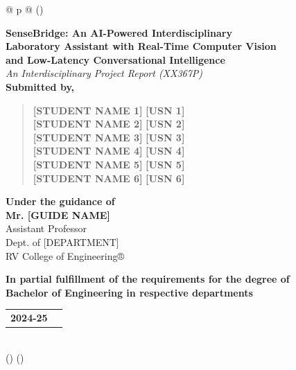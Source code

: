 \documentclass[]{article}
\begin{document}
\begin{longtable}[]{@{} p{\textwidth} @{}}
\toprule()
\begin{minipage}[b]{\linewidth}\raggedright
\centering
\vspace{1cm}
\textbf{SenseBridge: An AI-Powered Interdisciplinary} \\
\textbf{Laboratory Assistant with Real-Time Computer Vision} \\
\textbf{and Low-Latency Conversational Intelligence} \\
\vspace{0.5cm}
\emph{An Interdisciplinary Project Report (XX367P)} \\

\vspace{1.5cm}
\textbf{Submitted by,} \\
\begin{quote}
\textbf{[STUDENT NAME 1]} \textbf{[USN 1]} \\
\textbf{[STUDENT NAME 2]} \textbf{[USN 2]} \\
\textbf{[STUDENT NAME 3]} \textbf{[USN 3]} \\
\textbf{[STUDENT NAME 4]} \textbf{[USN 4]} \\
\textbf{[STUDENT NAME 5]} \textbf{[USN 5]} \\
\textbf{[STUDENT NAME 6]} \textbf{[USN 6]}
\end{quote}

\vspace{1.5cm}
\textbf{Under the guidance of} \\
\textbf{Mr. [GUIDE NAME]} \\
Assistant Professor \\
Dept. of [DEPARTMENT] \\
RV College of Engineering®

\vspace{1.5cm}
\textbf{In partial fulfillment of the requirements for the degree of} \\
\textbf{Bachelor of Engineering in respective departments} \\
\vspace{0.5cm}

\begin{tabular}{p{} p{}}
\textbf{2024-25} & \\
\end{tabular}
\end{minipage} \\
\midrule()
\endhead
\bottomrule()
\end{longtable}
\end{document}
